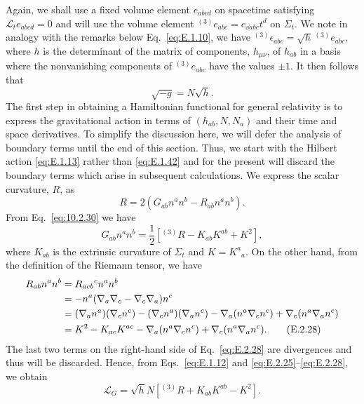 Again, we shall use a fixed volume element \(e_{abcd}\) on spacetime satisfying
\(\mathcal L_t e_{abcd}=0\) and will use the volume element
\({}^{(3)}e_{abc}=e_{\dd abc}t^d\) on \(\Sigma_t\). We note in analogy with the
remarks below Eq.~\eqref{eq:E.1.10}, we have
\({}^{(3)}\epsilon_{abc}=\sqrt{h}\,{}^{(3)}e_{abc}\), where \(h\) is the
determinant of the matrix of components, \(h_{\mu\nu}\), of \(h_{ab}\) in a basis
where the nonvanishing components of \({}^{(3)}e_{abc}\) have the values \(\pm1\).
It then follows that
\begin{equation}
  \sqrt{-g}=N\sqrt{h}.
  \tag{E.2.25}\label{eq:E.2.25}
\end{equation}
The first step in obtaining a Hamiltonian functional for general relativity is to
express the gravitational action in terms of \((h_{ab},N,N_a)\) and their time and
space derivatives. To simplify the discussion here, we will defer the analysis of
boundary terms until the end of this section. Thus, we start with the Hilbert action
\eqref{eq:E.1.13} rather than \eqref{eq:E.1.42} and for the present will discard the
boundary terms which arise in subsequent calculations. We express the scalar
curvature, \(R\), as
\begin{equation}
  R=2(G_{ab}n^an^b-R_{ab}n^an^b).
  \tag{E.2.26}\label{eq:E.2.26}
\end{equation}
From Eq.~\eqref{eq:10.2.30} we have
\begin{equation}
  G_{ab}n^an^b
    =\frac{1}{2}\left[{}^{(3)}R-K_{ab}K^{ab}+K^2\right],
  \tag{E.2.27}\label{eq:E.2.27}
\end{equation}
where \(K_{ab}\) is the extrinsic curvature of \(\Sigma_t\) and \(K=K^a{}_a\). On
the other hand, from the definition of the Riemann tensor, we have
\begin{align}
  R_{ab}n^an^b
    &=R_{acb}{}^c n^an^b\notag\\
    &=-n^a(\nabla_a\nabla_c-\nabla_c\nabla_a)n^c\notag\\
    &=(\nabla_an^a)(\nabla_cn^c)-(\nabla_cn^a)(\nabla_an^c)
      -\nabla_a(n^a\nabla_cn^c)+\nabla_c(n^a\nabla_an^c)\notag\\
    &=K^2-K_{ac}K^{ac}-\nabla_a(n^a\nabla_cn^c)
      +\nabla_c(n^a\nabla_an^c).
  \tag{E.2.28}\label{eq:E.2.28}
\end{align}
The last two terms on the right-hand side of Eq.~\eqref{eq:E.2.28} are divergences
and thus will be discarded. Hence, from Eqs.~\eqref{eq:E.1.12} and
\eqref{eq:E.2.25}--\eqref{eq:E.2.28}, we obtain
\begin{equation}
  \mathcal L_G=\sqrt{h}N\left[{}^{(3)}R+K_{ab}K^{ab}-K^2\right].
  \tag{E.2.29}\label{eq:E.2.29}
\end{equation}
